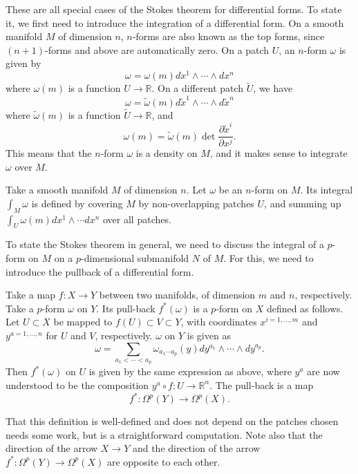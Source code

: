 \documentclass[12pt]{article}
\numberwithin{equation}{section}
\numberwithin{figure}{section}
\theoremstyle{remark}
\def\bR{\mathbb{R}}
\begin{document}
These are all special cases of the Stokes theorem for differential forms.
To state it, we first need to introduce the integration of a differential form.
On a smooth manifold $M$ of dimension $n$,
$n$-forms are also known as the top forms, 
since $(n+1)$-forms and above are automatically zero.
On a patch $U$, an $n$-form $\omega$ is given by \begin{equation}
\omega = \omega(m) dx^1\wedge \cdots \wedge dx^n
\end{equation} where $\omega(m)$ is a function $U\to \bR$.
On a different patch $\tilde U$, we have \begin{equation}
\omega = \tilde \omega(m) d\tilde x^1\wedge \cdots \wedge d\tilde x^n
\end{equation} where $\tilde \omega(m)$ is a function $\tilde U\to \bR$,
and \begin{equation}
\omega(m) = \tilde \omega(m) \det \frac{\partial \tilde x^i}{\partial x^j}.
\end{equation}
This means that the $n$-form $\omega$ is a density on $M$,
and it makes sense to integrate $\omega$ over $M$.
\begin{definition}
Take a smooth manifold $M$ of dimension $n$.
Let $\omega$ be an $n$-form on $M$.
Its integral $\int_M \omega$ is defined by covering $M$ by non-overlapping patches $U$,
and summing up $\int_U \omega(m) dx^1\wedge \cdots dx^n$ over all patches.
\end{definition}

To state the Stokes theorem in general,
we need to discuss the integral of a $p$-form on $M$ on a $p$-dimensional submanifold $N$ of $M$.
For this, we need to introduce the pullback of a differential form.
\begin{definition}
Take a map $f:X\to Y$ between two manifolds,
of dimension $m$ and $n$, respectively.
Take a $p$-form $\omega$ on $Y$.
Its pull-back $f^*(\omega)$ is a $p$-form on $X$ defined as follows.
Let $U\subset X$ be mapped to $f(U)\subset V \subset Y$,
with coordinates $x^{i=1,\ldots,m}$ and $y^{a=1,\ldots,n}$ for $U$ and $V$, respectively.
$\omega$ on $Y$ is given as \begin{equation}
\omega = \sum_{a_1<\cdots<a_p} \omega_{a_1\cdots a_p}(y) dy^{a_1}\wedge \cdots \wedge dy^{a_p}.
\end{equation}
Then $f^*(\omega)$ on $U$ is given by the same expression as above,
where $y^a$ are now understood to be the composition $y^a\circ f: U\to \bR^n$.
The pull-back is a map \begin{equation}
f^*: \Omega^p(Y)\to \Omega^p(X).
\end{equation}
\end{definition}
That this definition is well-defined and does not depend on the patches chosen 
needs some work, but is a straightforward computation.
Note also that the direction of the arrow $X\to Y$ and the direction of the arrow $f^*: \Omega^p(Y)\to \Omega^p(X)$ are opposite to each other.
\end{document}
